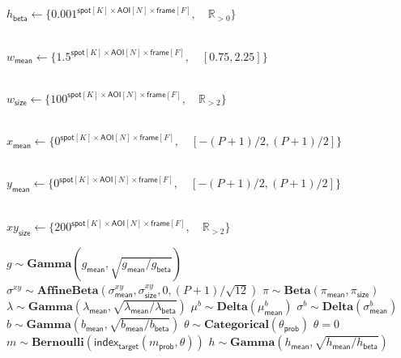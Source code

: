 \begin{algorithmic}[1]
{    $h_\mathsf{beta} \gets \{ 0.001^{\mathsf{spot}[K] \times \mathsf{AOI}[N] \times \mathsf{frame}[F]}, \quad \mathbb{R}_{>0} \} $ \rule{0pt}{3ex} \\
    $w_\mathsf{mean} \gets \{ 1.5^{\mathsf{spot}[K] \times \mathsf{AOI}[N] \times \mathsf{frame}[F]}, \quad [0.75, 2.25] \} $ \rule{0pt}{3ex} \\
    $w_\mathsf{size} \gets \{ 100^{\mathsf{spot}[K] \times \mathsf{AOI}[N] \times \mathsf{frame}[F]}, \quad \mathbb{R}_{>2} \} $ \rule{0pt}{3ex} \\
    $x_\mathsf{mean} \gets \{ 0^{\mathsf{spot}[K] \times \mathsf{AOI}[N] \times \mathsf{frame}[F]}, \quad [-(P+1)/2, (P+1)/2] \} $ \rule{0pt}{3ex} \\
    $y_\mathsf{mean} \gets \{ 0^{\mathsf{spot}[K] \times \mathsf{AOI}[N] \times \mathsf{frame}[F]}, \quad [-(P+1)/2, (P+1)/2] \} $ \rule{0pt}{3ex} \\
    $xy_\mathsf{size} \gets \{ 200^{\mathsf{spot}[K] \times \mathsf{AOI}[N] \times \mathsf{frame}[F]}, \quad \mathbb{R}_{>2} \} $ \rule{0pt}{3ex}
    }
\State $g \sim \mathbf{Gamma}(g_\mathsf{mean}, \sqrt{g_\mathsf{mean} / g_\mathsf{beta}})$
\State $\sigma^{xy} \sim \mathbf{AffineBeta}(\sigma^{xy}_\mathsf{mean}, \sigma^{xy}_\mathsf{size}, 0, (P+1) / \sqrt{12})$
\State $\pi \sim \mathbf{Beta}(\pi_\mathsf{mean}, \pi_\mathsf{size})$
\State $\lambda \sim \mathbf{Gamma}(\lambda_\mathsf{mean}, \sqrt{\lambda_\mathsf{mean} / \lambda_\mathsf{beta}})$
    \State $\mu^b \sim \mathbf{Delta}(\mu^b_\mathsf{mean})$
    \State $\sigma^b \sim \mathbf{Delta}(\sigma^b_\mathsf{mean})$
        \State $b \sim \mathbf{Gamma}(b_\mathsf{mean}, \sqrt{b_\mathsf{mean} / b_\mathsf{beta}})$
            \State $\theta \sim \mathbf{Categorical}\left( \theta_\mathsf{prob} \right)$
            \State $\theta = 0$
        \EndIf
            \State $m \sim \mathbf{Bernoulli}(\mathsf{index}_\mathsf{target} (m_\mathsf{prob}, \theta))$
                \State $h \sim \mathbf{Gamma}(h_\mathsf{mean}, \sqrt{h_\mathsf{mean} / h_\mathsf{beta}})$

\end{algorithmic}

